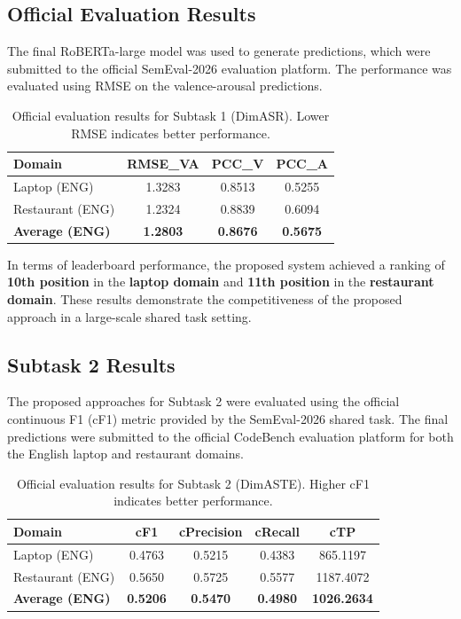 \documentclass{article}
\begin{document}
\subsection{Official Evaluation Results}

The final RoBERTa-large model was used to generate predictions, which were submitted to the official SemEval-2026 evaluation platform. The performance was evaluated using RMSE on the valence-arousal predictions.

\begin{table}[htbp]
\centering
\caption{Official evaluation results for Subtask 1 (DimASR). Lower RMSE indicates better performance.}
\label{tab:official_results}
\begin{tabular}{lccc}
\hline
\textbf{Domain} & \textbf{RMSE\_VA} & \textbf{PCC\_V} & \textbf{PCC\_A} \\
\hline
Laptop (ENG) & 1.3283 & 0.8513 & 0.5255 \\
Restaurant (ENG) & 1.2324 & 0.8839 & 0.6094 \\
\hline
\textbf{Average (ENG)} & \textbf{1.2803} & \textbf{0.8676} & \textbf{0.5675} \\
\hline
\end{tabular}
\end{table}

In terms of leaderboard performance, the proposed system achieved a ranking of \textbf{10th position} in the \textbf{laptop domain} and \textbf{11th position} in the \textbf{restaurant domain}. These results demonstrate the competitiveness of the proposed approach in a large-scale shared task setting.

\subsection{Subtask 2 Results}

The proposed approaches for Subtask 2 were evaluated using the official continuous F1 (cF1) metric provided by the SemEval-2026 shared task. The final predictions were submitted to the official CodeBench evaluation platform for both the English laptop and restaurant domains.

\begin{table}[htbp]
\centering
\caption{Official evaluation results for Subtask 2 (DimASTE). Higher cF1 indicates better performance.}
\label{tab:subtask2_results}
\begin{tabular}{lcccc}
\hline
\textbf{Domain} & \textbf{cF1} & \textbf{cPrecision} & \textbf{cRecall} & \textbf{cTP} \\
\hline
Laptop (ENG) & 0.4763 & 0.5215 & 0.4383 & 865.1197 \\
Restaurant (ENG) & 0.5650 & 0.5725 & 0.5577 & 1187.4072 \\
\hline
\textbf{Average (ENG)} & \textbf{0.5206} & \textbf{0.5470} & \textbf{0.4980} & \textbf{1026.2634} \\
\hline
\end{tabular}
\end{table}
\end{document}
